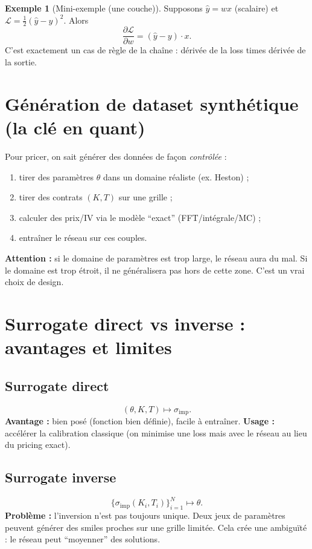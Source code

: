 \documentclass[11pt,a4paper]{report}
\newcommand{\1}{\mathbbm{1}}
\newcommand{\pd}[2]{\frac{\partial #1}{\partial #2}}
\theoremstyle{definition}
\newtheorem{example}{Exemple}[chapter]
\theoremstyle{plain}
\theoremstyle{remark}
\begin{document}
\begin{example}[Mini-exemple (une couche)]
Supposons $\hat{y}=w x$ (scalaire) et $\mathcal{L}=\frac12(\hat{y}-y)^2$.
Alors
\[
\pd{\mathcal{L}}{w} = (\hat{y}-y)\cdot x.
\]
C'est exactement un cas de règle de la chaîne : dérivée de la loss times dérivée de la sortie.
\end{example}

\section{Génération de dataset synthétique (la clé en quant)}
\label{sec:synthetic_data}

Pour pricer, on sait générer des données de façon \emph{contrôlée} :
\begin{enumerate}[label=\arabic*)]
  \item tirer des paramètres $\theta$ dans un domaine réaliste (ex. Heston) ;
  \item tirer des contrats $(K,T)$ sur une grille ;
  \item calculer des prix/IV via le modèle ``exact'' (FFT/intégrale/MC) ;
  \item entraîner le réseau sur ces couples.
\end{enumerate}

\textbf{Attention :} si le domaine de paramètres est trop large, le réseau aura du mal.
Si le domaine est trop étroit, il ne généralisera pas hors de cette zone.
C'est un vrai choix de design.

\section{Surrogate direct vs inverse : avantages et limites}
\subsection{Surrogate direct}
\[
(\theta,K,T)\mapsto \sigma_{\mathrm{imp}}.
\]
\textbf{Avantage :} bien posé (fonction bien définie), facile à entraîner.
\textbf{Usage :} accélérer la calibration classique (on minimise une loss mais avec le réseau au lieu du pricing exact).

\subsection{Surrogate inverse}
\[
\{\sigma_{\mathrm{imp}}(K_i,T_i)\}_{i=1}^N \mapsto \theta.
\]
\textbf{Problème :} l'inversion n'est pas toujours unique.
Deux jeux de paramètres peuvent générer des smiles proches sur une grille limitée.
Cela crée une ambiguïté : le réseau peut ``moyenner'' des solutions.
\end{document}
